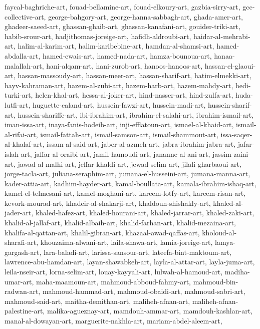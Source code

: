 \documentclass{article}
\begin{document}
faycal-baghriche-art,
fouad-bellamine-art,
fouad-elkoury-art,
gazbia-sirry-art,
gcc-collective-art,
george-bahgory-art,
george-hanna-sabbagh-art,
ghada-amer-art,
ghadeer-saeed-art,
ghassan-ghaib-art,
ghassan-kanafani-art,
gouider-triki-art,
habib-srour-art,
hadjithomas-joreige-art,
hafidh-aldroubi-art,
haidar-al-mehrabi-art,
halim-al-karim-art,
halim-karibebine-art,
hamdan-al-shamsi-art,
hamed-abdalla-art,
hamed-ewais-art,
hamed-nada-art,
hamza-bounoua-art,
hanaa-malallah-art,
hani-alqam-art,
hani-zurob-art,
hanoos-hanoos-art,
hassan-el-glaoui-art,
hassan-massoudy-art,
hassan-meer-art,
hassan-sharif-art,
hatim-elmekki-art,
hayv-kahraman-art,
hazem-al-zubi-art,
hazem-harb-art,
hazem-mahdy-art,
hedi-turki-art,
helen-khal-art,
hessa-al-joker-art,
hind-nasser-art,
hind-zulfa-art,
huda-lutfi-art,
huguette-caland-art,
hussein-fawzi-art,
hussein-madi-art,
hussein-sharif-art,
hussein-shariffe-art,
ibi-ibrahim-art,
ibrahim-el-salahi-art,
ibrahim-ismail-art,
iman-issa-art,
inaya-fanis-hodeib-art,
inji-efflatoun-art,
ismael-al-khaid-art,
ismail-al-rifai-art,
ismail-fattah-art,
ismail-samson-art,
ismail-shammout-art,
issa-saqer-al-khalaf-art,
issam-al-said-art,
jaber-al-azmeh-art,
jabra-ibrahim-jabra-art,
jafar-islah-art,
jaffar-al-oraibi-art,
jamil-hamoudi-art,
jananne-al-ani-art,
jassim-zaini-art,
jawad-al-malhi-art,
jeffar-khaldi-art,
jewad-selim-art,
jilali-gharbaoui-art,
jorge-tacla-art,
juliana-seraphim-art,
jumana-el-husseini-art,
jumana-manna-art,
kader-attia-art,
kadhim-hayder-art,
kamal-boullata-art,
kamala-ibrahim-ishaq-art,
kamel-el-telmesani-art,
kamel-moghani-art,
kareem-lotfy-art,
kareem-risan-art,
kevork-mourad-art,
khadeir-al-shakarji-art,
khaldoun-shishakly-art,
khaled-al-jader-art,
khaled-hafez-art,
khaled-hourani-art,
khaled-jarrar-art,
khaled-zaki-art,
khalid-al-jallaf-art,
khalid-albaih-art,
khalid-farhan-art,
khalid-mezaina-art,
khalifa-al-qattan-art,
khalil-gibran-art,
khazaal-awad-qaffas-art,
kholoud-al-sharafi-art,
khouzaima-alwani-art,
laila-shawa-art,
lamia-joreige-art,
lamya-gargash-art,
lara-baladi-art,
larissa-sansour-art,
lateefa-bint-maktoum-art,
lawrence-abu-hamdan-art,
layan-shawabkeh-art,
layla-al-attar-art,
layla-juma-art,
leila-nseir-art,
lorna-selim-art,
louay-kayyali-art,
lulwah-al-hamoud-art,
madiha-umar-art,
maha-maamoun-art,
mahmoud-abboud-fahmy-art,
mahmoud-bin-radwan-art,
mahmoud-hammad-art,
mahmoud-obaidi-art,
mahmoud-sabri-art,
mahmoud-said-art,
maitha-demithan-art,
maliheh-afnan-art,
maliheh-afnan-palestine-art,
malika-agueznay-art,
mamdouh-ammar-art,
mamdouh-kashlan-art,
manal-al-dowayan-art,
marguerite-nakhla-art,
mariam-abdel-aleem-art,
\end{document}
